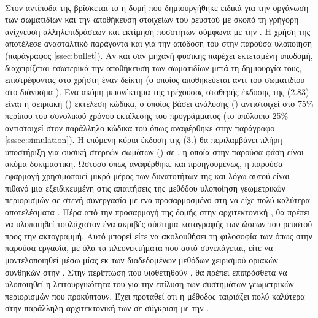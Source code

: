\paragraph{} Στον αντίποδα της  βρίσκεται το  η δομή που
δημιουργήθηκε ειδικά για την οργάνωση των σωματιδίων και την αποθήκευση στοιχείων του
ρευστού με σκοπό τη γρήγορη ανίχνευση αλληλεπιδράσεων και εκτίμηση ποσοτήτων σύμφωνα με
την . Η χρήση της  αποτέλεσε ανασταλτικό παράγοντα και για την
απόδοση του  στην παρούσα υλοποίηση (παράγραφος \ref{ssec:bullet}). Αν και
σαν μηχανή φυσικής παρέχει εκτεταμένη υποδομή, διαχειρίζεται εσωτερικά την αποθήκευση των
σωματιδίων μετά τη δημιουργία τους, επιστρέφοντας στο χρήστη έναν δείκτη (ο οποίος
αποθηκεύεται αντι του σωματιδίου στο διάνυσμα ). Ένα ακόμη μειονέκτημα της
τρέχουσας σταθερής έκδοσης της  (2.83) είναι η σειριακή ()
εκτέλεση κώδικα, ο οποίος βάσει ανάλυσης () αντιστοιχεί στο 75\% περίπου
του συνολικού χρόνου εκτέλεσης του προγράμματος (το υπόλοιπο 25\% αντιστοιχεί στον
παράλληλο κώδικα του  όπως αναφέρθηκε στην παράγραφο \ref{sssec:simulation}). Η
επόμενη κύρια έκδοση της  (3.) θα περιλαμβάνει πλήρη υποστήριξη για
φυσική στερεών σωμάτων () σε , η οποία στην παρούσα φάση
είναι ακόμα δοκιμαστική. Ωστόσο όπως αναφέρθηκε και προηγουμένως, η παρούσα εφαρμογή
χρησιμοποιεί μικρό μέρος των δυνατοτήτων της  και λόγω αυτού είναι πιθανό μια
εξειδικευμένη στις απαιτήσεις της μεθόδου υλοποίηση γεωμετρικών περιορισμών σε στενή
συνεργασία με ενα προσαρμοσμένο στη   να είχε πολύ καλύτερα
αποτελέσματα \cite{goswami2010interactive}. Πέρα από την προσαρμογή της δομής στην
αρχιτεκτονική , θα πρέπει να υλοποιηθεί τουλάχιστον ένα ακριβές σύστημα
καταγραφής των ώσεων του ρευστού προς την ακτογραμμή. Αυτό μπορεί είτε να ακολουθήσει τη
φιλοσοφία των  όπως στην παρούσα εργασία, με όλα τα πλεονεκτήματα που αυτό
συνεπάγεται, είτε να μοντελοποιηθεί μέσω μίας εκ των διαδεδομένων μεθόδων χειρισμού
οριακών συνθηκών στην . Στην περίπτωση που υιοθετηθούν , θα πρέπει
επιπρόσθετα να υλοποιηθεί η λειτουργικότητα του  για την επίλυση των συστημάτων
γεωμετρικών περιορισμών που προκύπτουν. Έχει προταθεί οτι η μέθοδος  ταιριάζει πολύ καλύτερα στην παράλληλη αρχιτεκτονική των  σε
σύγκριση με την  \cite{tamis2015}.

